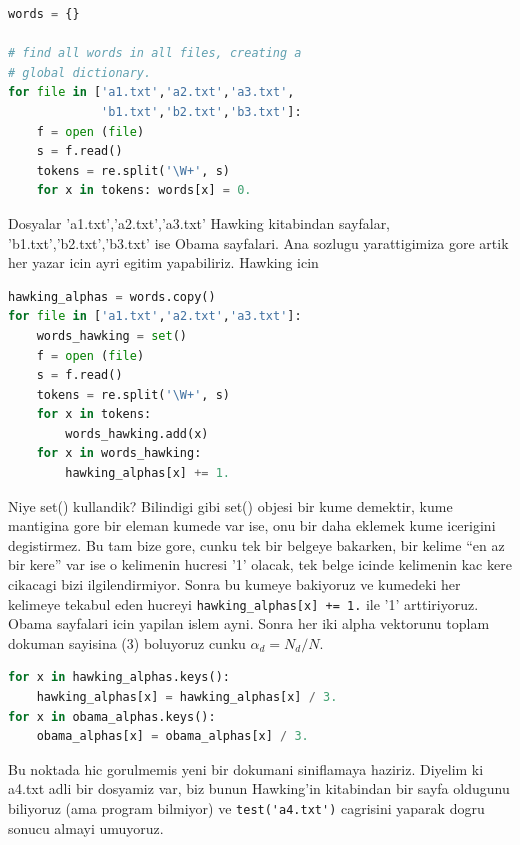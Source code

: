 \documentclass[12pt,fleqn]{article}\usepackage{../common}
\begin{document}
\begin{lstlisting}[language=Python]
words = {}

# find all words in all files, creating a 
# global dictionary.
for file in ['a1.txt','a2.txt','a3.txt',
             'b1.txt','b2.txt','b3.txt']:
    f = open (file)
    s = f.read()
    tokens = re.split('\W+', s)
    for x in tokens: words[x] = 0.
\end{lstlisting}

Dosyalar 'a1.txt','a2.txt','a3.txt' Hawking kitabindan sayfalar,
'b1.txt','b2.txt','b3.txt' ise Obama sayfalari. Ana sozlugu yarattigimiza gore
artik her yazar icin ayri egitim yapabiliriz. Hawking icin 

\begin{lstlisting}[language=Python]
hawking_alphas = words.copy()   
for file in ['a1.txt','a2.txt','a3.txt']:
    words_hawking = set()
    f = open (file)
    s = f.read()
    tokens = re.split('\W+', s)
    for x in tokens: 
        words_hawking.add(x)
    for x in words_hawking:
        hawking_alphas[x] += 1.        
\end{lstlisting}

Niye set() kullandik? Bilindigi gibi set() objesi bir kume demektir, kume
mantigina gore bir eleman kumede var ise, onu bir daha eklemek kume icerigini
degistirmez. Bu tam bize gore, cunku tek bir belgeye bakarken, bir kelime ``en
az bir kere'' var ise o kelimenin hucresi '1' olacak, tek belge icinde kelimenin
kac kere cikacagi bizi ilgilendirmiyor. Sonra bu kumeye bakiyoruz ve kumedeki
her kelimeye tekabul eden hucreyi \verb!hawking_alphas[x] += 1.! ile '1'
arttiriyoruz. Obama sayfalari icin yapilan islem ayni. Sonra her iki alpha
vektorunu toplam dokuman sayisina (3) boluyoruz cunku $\alpha_d = N_d / N$.

\begin{lstlisting}[language=Python]
for x in hawking_alphas.keys():
    hawking_alphas[x] = hawking_alphas[x] / 3.        
for x in obama_alphas.keys():
    obama_alphas[x] = obama_alphas[x] / 3.        
\end{lstlisting}

Bu noktada hic gorulmemis yeni bir dokumani siniflamaya haziriz. Diyelim ki
a4.txt adli bir dosyamiz var, biz bunun Hawking'in kitabindan bir sayfa oldugunu
biliyoruz (ama program bilmiyor) ve \verb!test('a4.txt')! cagrisini yaparak dogru
sonucu almayi umuyoruz. 
\end{document}
